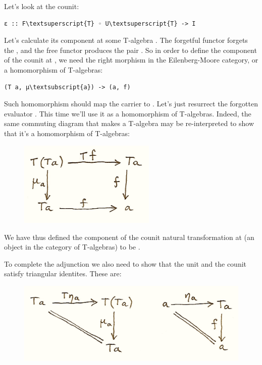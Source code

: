 Let's look at the counit:

\begin{Verbatim}[commandchars=\\\{\}]
ε :: F\textsuperscript{T} ◦ U\textsuperscript{T} -> I
\end{Verbatim}
Let's calculate its component at some T-algebra . The
forgetful functor forgets the , and the free functor produces
the pair . So in order to define the component of
the counit  at , we need the right morphism in
the Eilenberg-Moore category, or a homomorphism of T-algebras:

\begin{Verbatim}[commandchars=\\\{\}]
(T a, μ\textsubscript{a}) -> (a, f)
\end{Verbatim}
Such homomorphism should map the carrier  to .
Let's just resurrect the forgotten evaluator . This time we'll
use it as a homomorphism of T-algebras. Indeed, the same commuting
diagram that makes  a T-algebra may be re-interpreted to show
that it's a homomorphism of T-algebras:

\begin{figure}[H]
\centering
\includegraphics[width=2.57292in]{images/talg31.png}
\end{figure}

\noindent
We have thus defined the component of the counit natural transformation
 at  (an object in the category of T-algebras)
to be .

To complete the adjunction we also need to show that the unit and the
counit satisfy triangular identites. These are:

\begin{figure}[H]
\centering
\includegraphics[width=\textwidth]{images/talg4.png}
\end{figure}

